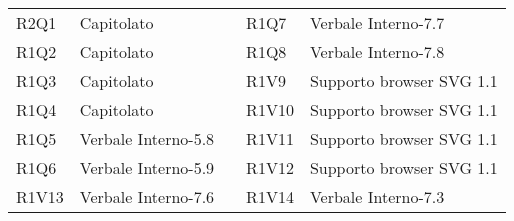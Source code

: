 \begin{center}
\begin{longtable}{C{2cm} | C{5cm} C{0.2cm} C{2cm} | C{5cm}}
R2Q1 & Capitolato &  & R1Q7 & Verbale Interno-7.7\\
R1Q2 & Capitolato &  & R1Q8 & Verbale Interno-7.8\\
R1Q3 & Capitolato &  & R1V9 & Supporto browser SVG 1.1\\
R1Q4 & Capitolato &  & R1V10 & Supporto browser SVG 1.1\\
R1Q5 & Verbale Interno-5.8 &  & R1V11 & Supporto browser SVG 1.1\\
R1Q6 & Verbale Interno-5.9 &  & R1V12 & Supporto browser SVG 1.1\\
R1V13 & Verbale Interno-7.6 &  & R1V14 & Verbale Interno-7.3\\
\end{longtable}
\end{center}

























